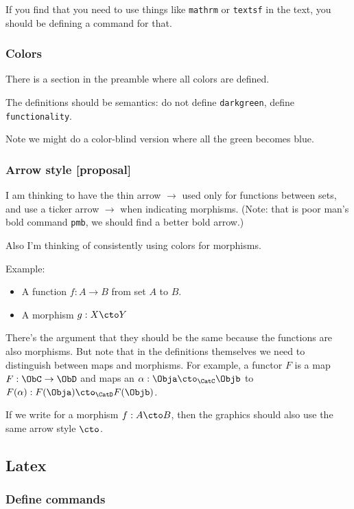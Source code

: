 If you find that you need to use things like \texttt{mathrm} or \texttt{textsf} in the text, you should be defining a command for that.

\subsubsection*{Colors}

There is a section in the preamble where all colors are defined.

The definitions should be semantics: do not define \texttt{darkgreen}, define \texttt{functionality}.

Note we might do a color-blind version where all the green becomes blue.


\subsubsection*{Arrow style [proposal]}

I am thinking to have the thin arrow $\to$ used only for functions between sets, and use a ticker arrow $\pmb{\to}$ when indicating morphisms.
(Note: that is poor man's bold command \texttt{pmb}, we should find a better bold arrow.)


Also I'm thinking of consistently using colors for morphisms.

Example:
\begin{itemize}
  \item A function $f: A \to B$ from set $A$ to $B$.
  \item A morphism $g: X \cto  Y$
\end{itemize}

There's the argument that they should be the same because the functions are also morphisms. But note that in the definitions themselves we need to distinguish between maps and morphisms. For example, a functor $F$ is a map $F: \ObC \to \ObD$ and maps an $\alpha: \Obja \cto_{\CatC} \Objb $ to $F(\alpha): F(\Obja) \cto_{\CatD} F(\Objb) $.


If we write for a morphism $f: A \cto B$, then the graphics should also use the
same arrow style $\cto$.


\subsection*{Latex}

\subsubsection*{Define commands }

